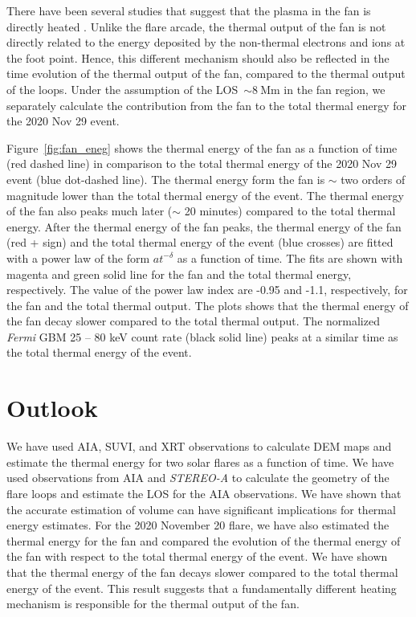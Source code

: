 There have been several studies that suggest that the plasma in the fan is directly heated \citep{hanneman14,chen17,reeves17,warren18,cai22,xie23}. Unlike the flare arcade, the thermal output of the fan is not directly related to the energy deposited by the non-thermal electrons and ions at the foot point. Hence, this different mechanism should also be reflected in the time evolution of the thermal output of the fan, compared to the thermal output of the loops. Under the assumption of the LOS~$\mathrm{\sim 8~Mm}$ in the fan region, we separately calculate the contribution from the fan to the total thermal energy for the 2020 Nov 29 event.

Figure~\ref{fig:fan_eneg} shows the thermal energy of the fan as a function of time (red dashed line) in comparison to the total thermal energy of the 2020 Nov 29 event (blue dot-dashed line). The thermal energy form the fan is $\sim$ two orders of magnitude lower than the total thermal energy of the event. The thermal energy of the fan also peaks much later ($\sim$ 20 minutes) compared to the total thermal energy. After the thermal energy of the fan peaks, the thermal energy of the fan (red + sign) and the total thermal energy of the event (blue crosses) are fitted with a power law of the form $at^{-\delta}$ as a function of time. The fits are shown with magenta and green solid line for the fan and the total thermal energy, respectively. The value of the power law index are -0.95 and -1.1, respectively, for the fan and the total thermal output. The plots shows that the thermal energy of the fan decay slower compared to the total thermal output. The normalized {\it Fermi} GBM 25 {--} 80 keV count rate (black solid line) peaks at a similar time as the total thermal energy of the event.

\section{Outlook}\label{sec:out}


We have used AIA, SUVI, and XRT observations to calculate DEM maps and estimate the thermal energy for two solar flares as a function of time. We have used observations from AIA and {\it STEREO-A} to calculate the geometry of the flare loops and estimate the LOS for the AIA observations. We have shown that the accurate estimation of volume can have significant implications for thermal energy estimates. For the 2020 November 20 flare, we have also estimated the thermal energy for the fan and compared the evolution of the thermal energy of the fan with respect to the total thermal energy of the event. We have shown that the thermal energy of the fan decays slower compared to the total thermal energy of the event. This result suggests that a fundamentally different heating mechanism is responsible for the thermal output of the fan.

